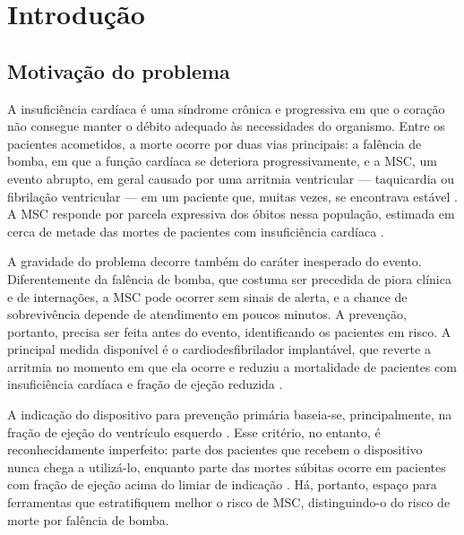 
\chapter{Introdução}
\label{cap:introducao}

\section{Motivação do problema}
\label{sec:intro-motivacao}

A insuficiência cardíaca é uma síndrome crônica e progressiva em que o
coração não consegue manter o débito adequado às necessidades do organismo.
Entre os pacientes acometidos, a morte ocorre por duas vias principais: a
falência de bomba, em que a função cardíaca se deteriora progressivamente, e
a \gls{MSC}, um evento abrupto, em geral causado por uma arritmia ventricular
--- taquicardia ou fibrilação ventricular --- em um paciente que, muitas
vezes, se encontrava estável \cite{tomaselli2004sudden,zeppenfeld2022esc}. A \gls{MSC} responde por parcela expressiva dos
óbitos nessa população, estimada em cerca de metade das mortes de pacientes
com insuficiência cardíaca \cite{tomaselli2004sudden}.

A gravidade do problema decorre também do caráter inesperado do evento.
Diferentemente da falência de bomba, que costuma ser precedida de piora
clínica e de internações, a \gls{MSC} pode ocorrer sem sinais de alerta, e a
chance de sobrevivência depende de atendimento em poucos minutos. A
prevenção, portanto, precisa ser feita antes do evento, identificando os
pacientes em risco. A principal medida disponível é o
cardiodesfibrilador implantável, que reverte a arritmia no momento em que
ela ocorre e reduziu a mortalidade de pacientes com insuficiência cardíaca e
fração de ejeção reduzida \cite{bardy2005amiodarone}.

A indicação do dispositivo para prevenção primária baseia-se,
principalmente, na fração de ejeção do ventrículo esquerdo
\cite{zeppenfeld2022esc}. Esse critério, no entanto, é reconhecidamente
imperfeito: parte dos pacientes que recebem o dispositivo nunca chega a
utilizá-lo, enquanto parte das mortes súbitas ocorre em pacientes com fração
de ejeção acima do limiar de indicação \cite{zeppenfeld2022esc}. Há,
portanto, espaço para ferramentas que estratifiquem melhor o risco de
\gls{MSC}, distinguindo-o do risco de morte por falência de bomba.

